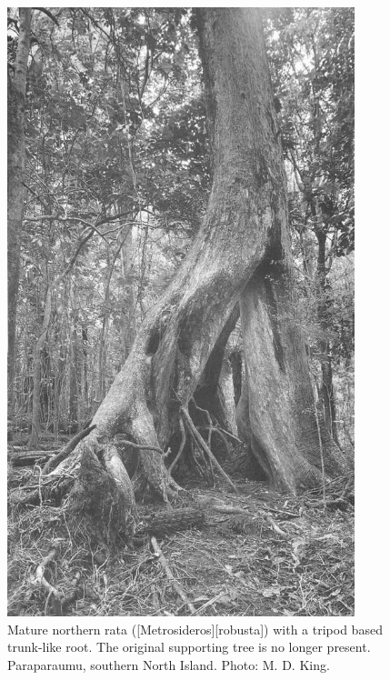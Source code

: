 \begin{figure}[htb]
\begin{minipage}[t]{0.45\textwidth}
    	\includegraphics[width=0.9\textwidth]{graphics/figure51rata.jpg}
    	\caption[Mature northern rata with a tripod based trunk-like root]{Mature northern rata ([Metrosideros][robusta]) with a tripod based trunk-like root.
    	The original supporting tree is no longer present.
    	Paraparaumu, southern North Island.
    	Photo: M. D. King.}%
    	\label{fig:51rata}
	\end{minipage}
\end{figure}

